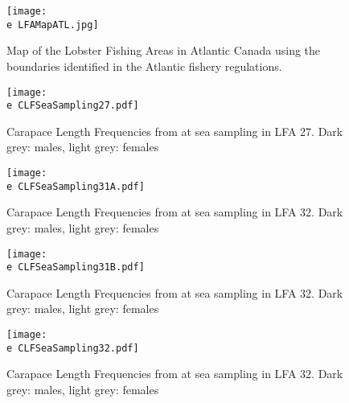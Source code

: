 \documentclass[11pt]{article}
\newcommand{\e}{\string~/bio.data/bio.lobster/figures/LFA2733Framework2018/} %
\begin{document}
\begin{landscape}
\begin{figure}
\centering
    \texttt{[image: \\e LFAMapATL.jpg]}
    \caption{Map of the Lobster Fishing Areas in Atlantic Canada using the boundaries identified in the Atlantic fishery regulations.}

\end{figure}
\end{landscape}


    \begin{figure}
    \centering
        \texttt{[image: \\e CLFSeaSampling27.pdf]}
        \caption{Carapace Length Frequencies from at sea sampling in LFA 27. Dark grey: males, light grey: females}

    \end{figure}

    \begin{figure}
    \centering
        \texttt{[image: \\e CLFSeaSampling31A.pdf]}
        \caption{Carapace Length Frequencies from at sea sampling in LFA 32. Dark grey: males, light grey: females}

    \end{figure}

    \begin{figure}
    \centering
        \texttt{[image: \\e CLFSeaSampling31B.pdf]}
        \caption{Carapace Length Frequencies from at sea sampling in LFA 32. Dark grey: males, light grey: females}

    \end{figure}

    \begin{figure}
    \centering
        \texttt{[image: \\e CLFSeaSampling32.pdf]}
        \caption{Carapace Length Frequencies from at sea sampling in LFA 32. Dark grey: males, light grey: females}

    \end{figure}
\end{document}
